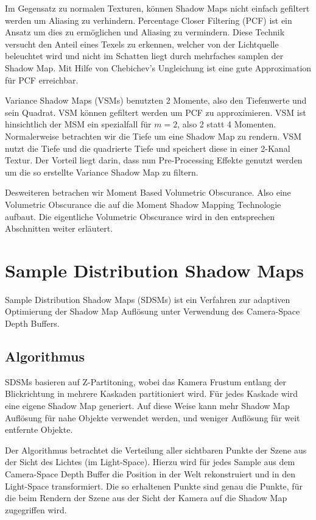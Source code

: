 \documentclass[runningheaders,a4paper]{llncs}
\begin{document}
Im Gegensatz zu normalen Texturen, können Shadow Maps nicht einfach gefiltert werden um Aliasing zu verhindern. 
Percentage Closer Filtering (PCF) ist ein Ansatz um dies zu ermöglichen und Aliasing zu vermindern. Diese Technik versucht den Anteil eines Texels zu erkennen, welcher von der Lichtquelle beleuchtet wird und nicht im Schatten liegt durch mehrfaches samplen der Shadow Map. 
Mit Hilfe von Chebichev's Ungleichung ist eine gute Approximation für PCF erreichbar. \cite{reeves1987rendering}

Variance Shadow Maps (VSMs) benutzten 2 Momente, also den Tiefenwerte und sein Quadrat.
VSM können gefiltert werden um PCF zu approximieren.
VSM ist hinsichtlich der MSM ein spezialfall für $m = 2$, also 2 statt 4 Momenten. Normalerweise betrachten wir die Tiefe um eine Shadow Map zu rendern. VSM nutzt die Tiefe und die quadrierte Tiefe und speichert diese in einer 2-Kanal Textur. Der Vorteil liegt darin, dass nun Pre-Processing Effekte genutzt werden um die so erstellte Variance Shadow Map zu filtern. \cite{donnelly2006variance}

Desweiteren betrachen wir Moment Based Volumetric Obscurance. Also eine Volumetric Obscurance die auf die Moment Shadow Mapping Technologie aufbaut. Die eigentliche Volumetric Obscurance wird in den entsprechen Abschnitten weiter erläutert.

\section{Sample Distribution Shadow Maps}

Sample Distribution Shadow Maps (SDSMs) ist ein Verfahren zur adaptiven Optimierung der Shadow Map Auflösung unter Verwendung des Camera-Space Depth Buffers.

\subsection{Algorithmus}

SDSMs basieren auf Z-Partitoning, wobei das Kamera Frustum entlang der Blickrichtung in mehrere Kaskaden partitioniert wird.
Für jedes Kaskade wird eine eigene Shadow Map generiert.
Auf diese Weise kann mehr Shadow Map Auflösung für nahe Objekte verwendet werden, und weniger Auflösung für weit entfernte Objekte.


Der Algorithmus betrachtet die Verteilung aller sichtbaren Punkte der Szene aus der Sicht des Lichtes (im Light-Space).
Hierzu wird für jedes Sample aus dem Camera-Space Depth Buffer die Position in der Welt rekonstruiert und in den Light-Space transformiert.
Die so erhaltenen Punkte sind genau die Punkte, für die beim Rendern der Szene aus der Sicht der Kamera auf die Shadow Map zugegriffen wird.
\end{document}
